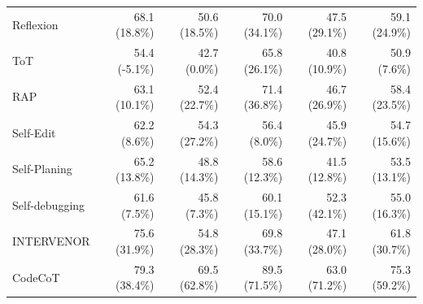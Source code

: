 \documentclass{article}
\begin{document}
\begin{table}
\begin{tabular}{lrrrrr}
Reflexion& 68.1 (18.8\%)&50.6 (18.5\%)&70.0 (34.1\%)&47.5 (29.1\%)&59.1 (24.9\%)\\
ToT& 54.4 (-5.1\%)&42.7 (0.0\%)&65.8 (26.1\%)&40.8 (10.9\%)&50.9 (7.6\%)\\
RAP& 63.1 (10.1\%)&52.4 (22.7\%)&71.4 (36.8\%)&46.7 (26.9\%)&58.4 (23.5\%)\\
Self-Edit& 62.2 (8.6\%)&54.3 (27.2\%)&56.4 (8.0\%)&45.9 (24.7\%)&54.7 (15.6\%)\\
Self-Planing& 65.2 (13.8\%)&48.8 (14.3\%)&58.6 (12.3\%)&41.5 (12.8\%)&53.5 (13.1\%)\\
Self-debugging& 61.6 (7.5\%)&45.8 (7.3\%)&60.1 (15.1\%)&52.3 (42.1\%)&55.0 (16.3\%)\\
INTERVENOR& 75.6 (31.9\%)&54.8 (28.3\%)&69.8 (33.7\%)&47.1 (28.0\%)&61.8 (30.7\%)\\
CodeCoT& 79.3 (38.4\%)&69.5 (62.8\%)&89.5 (71.5\%)&63.0 (71.2\%)&75.3 (59.2\%)\\


\end{tabular}
\end{table}
\end{document}
